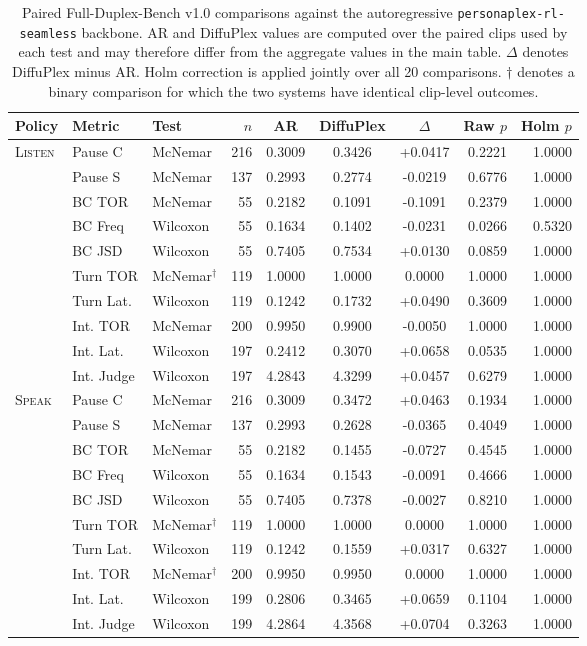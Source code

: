 \begin{table}[t]
\centering
\caption{
Paired Full-Duplex-Bench v1.0 comparisons against the autoregressive \texttt{personaplex-rl-seamless} backbone.
AR and DiffuPlex values are computed over the paired clips used by each test and may therefore differ from the aggregate values in the main table.
$\Delta$ denotes DiffuPlex minus AR.
Holm correction is applied jointly over all 20 comparisons.
$\dagger$ denotes a binary comparison for which the two systems have identical clip-level outcomes.
}
\label{atab:paired_significance}
\small
\begin{tabular}{lllrcccrr}
\toprule
Policy & Metric & Test & $n$ & AR & DiffuPlex & $\Delta$ & Raw $p$ & Holm $p$ \\
\midrule
\textsc{Listen}
& Pause C & McNemar & 216 & 0.3009 & 0.3426 & +0.0417 & 0.2221 & 1.0000 \\
& Pause S & McNemar & 137 & 0.2993 & 0.2774 & -0.0219 & 0.6776 & 1.0000 \\
& BC TOR & McNemar & 55 & 0.2182 & 0.1091 & -0.1091 & 0.2379 & 1.0000 \\
& BC Freq & Wilcoxon & 55 & 0.1634 & 0.1402 & -0.0231 & 0.0266 & 0.5320 \\
& BC JSD & Wilcoxon & 55 & 0.7405 & 0.7534 & +0.0130 & 0.0859 & 1.0000 \\
& Turn TOR & McNemar$^\dagger$ & 119 & 1.0000 & 1.0000 & 0.0000 & 1.0000 & 1.0000 \\
& Turn Lat. & Wilcoxon & 119 & 0.1242 & 0.1732 & +0.0490 & 0.3609 & 1.0000 \\
& Int. TOR & McNemar & 200 & 0.9950 & 0.9900 & -0.0050 & 1.0000 & 1.0000 \\
& Int. Lat. & Wilcoxon & 197 & 0.2412 & 0.3070 & +0.0658 & 0.0535 & 1.0000 \\
& Int. Judge & Wilcoxon & 197 & 4.2843 & 4.3299 & +0.0457 & 0.6279 & 1.0000 \\
\midrule
\textsc{Speak}
& Pause C & McNemar & 216 & 0.3009 & 0.3472 & +0.0463 & 0.1934 & 1.0000 \\
& Pause S & McNemar & 137 & 0.2993 & 0.2628 & -0.0365 & 0.4049 & 1.0000 \\
& BC TOR & McNemar & 55 & 0.2182 & 0.1455 & -0.0727 & 0.4545 & 1.0000 \\
& BC Freq & Wilcoxon & 55 & 0.1634 & 0.1543 & -0.0091 & 0.4666 & 1.0000 \\
& BC JSD & Wilcoxon & 55 & 0.7405 & 0.7378 & -0.0027 & 0.8210 & 1.0000 \\
& Turn TOR & McNemar$^\dagger$ & 119 & 1.0000 & 1.0000 & 0.0000 & 1.0000 & 1.0000 \\
& Turn Lat. & Wilcoxon & 119 & 0.1242 & 0.1559 & +0.0317 & 0.6327 & 1.0000 \\
& Int. TOR & McNemar$^\dagger$ & 200 & 0.9950 & 0.9950 & 0.0000 & 1.0000 & 1.0000 \\
& Int. Lat. & Wilcoxon & 199 & 0.2806 & 0.3465 & +0.0659 & 0.1104 & 1.0000 \\
& Int. Judge & Wilcoxon & 199 & 4.2864 & 4.3568 & +0.0704 & 0.3263 & 1.0000 \\
\bottomrule
\end{tabular}
\end{table}